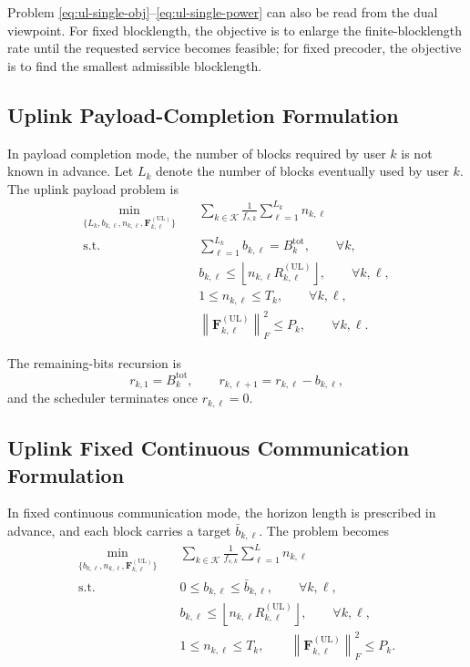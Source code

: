 \documentclass[11pt]{article}
\newcommand{\Kset}{\mathcal{K}}
\newcommand{\F}{\mathbf{F}}
\newcommand{\norm}[1]{\left\lVert #1 \right\rVert}
\newcommand{\floor}[1]{\left\lfloor #1 \right\rfloor}
\newcommand{\UL}{\mathrm{UL}}
\begin{document}
Problem \eqref{eq:ul-single-obj}--\eqref{eq:ul-single-power} can also be read
from the dual viewpoint. For fixed blocklength, the objective is to enlarge the
finite-blocklength rate until the requested service becomes feasible; for fixed
precoder, the objective is to find the smallest admissible blocklength.

\subsection{Uplink Payload-Completion Formulation}

In payload completion mode, the number of blocks required by user $k$ is not
known in advance. Let $L_k$ denote the number of blocks eventually used by user
$k$. The uplink payload problem is
\begin{subequations}
\begin{align}
\min_{\{L_k,b_{k,\ell},n_{k,\ell},\F_{k,\ell}^{(\UL)}\}}
\quad
&
\sum_{k\in\Kset}\frac{1}{f_{s,k}}\sum_{\ell=1}^{L_k} n_{k,\ell}
\label{eq:ul-payload-obj}
\\
\text{s.t.}\quad
&
\sum_{\ell=1}^{L_k} b_{k,\ell} = B_k^{\mathrm{tot}},
\qquad \forall k,
\label{eq:ul-payload-conservation}
\\
&
b_{k,\ell}
\le
\floor{n_{k,\ell}R_{k,\ell}^{(\UL)}},
\qquad \forall k,\ell,
\label{eq:ul-payload-fbl}
\\
&
1 \le n_{k,\ell} \le T_k,
\qquad \forall k,\ell,
\label{eq:ul-payload-n}
\\
&
\norm{\F_{k,\ell}^{(\UL)}}_F^2 \le P_k,
\qquad \forall k,\ell.
\label{eq:ul-payload-power}
\end{align}
\end{subequations}

The remaining-bits recursion is
\begin{equation}
r_{k,1}=B_k^{\mathrm{tot}},
\qquad
r_{k,\ell+1}=r_{k,\ell}-b_{k,\ell},
\label{eq:ul-remaining-recursion}
\end{equation}
and the scheduler terminates once $r_{k,\ell}=0$.

\subsection{Uplink Fixed Continuous Communication Formulation}

In fixed continuous communication mode, the horizon length is prescribed in
advance, and each block carries a target $\bar b_{k,\ell}$. The problem becomes
\begin{subequations}
\begin{align}
\min_{\{b_{k,\ell},n_{k,\ell},\F_{k,\ell}^{(\UL)}\}}
\quad
&
\sum_{k\in\Kset}\frac{1}{f_{s,k}}\sum_{\ell=1}^{L} n_{k,\ell}
\label{eq:ul-fixed-obj}
\\
\text{s.t.}\quad
&
0 \le b_{k,\ell} \le \bar b_{k,\ell},
\qquad \forall k,\ell,
\label{eq:ul-fixed-target}
\\
&
b_{k,\ell}
\le
\floor{n_{k,\ell}R_{k,\ell}^{(\UL)}},
\qquad \forall k,\ell,
\label{eq:ul-fixed-fbl}
\\
&
1 \le n_{k,\ell} \le T_k,
\qquad
\norm{\F_{k,\ell}^{(\UL)}}_F^2 \le P_k.
\label{eq:ul-fixed-other}
\end{align}
\end{subequations}
\end{document}
